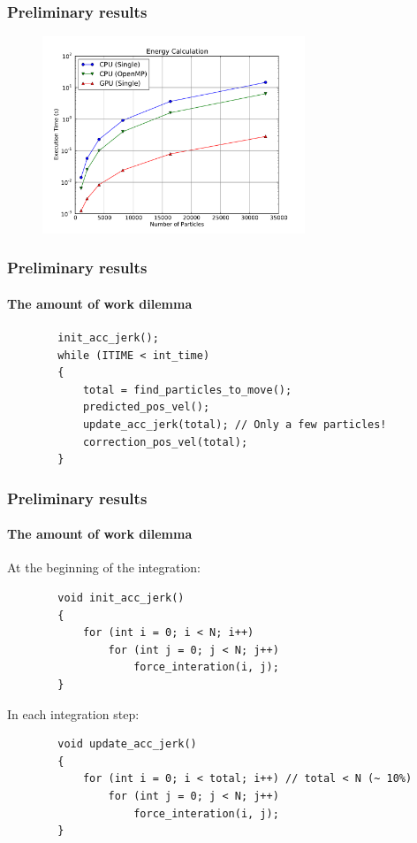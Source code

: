 \begin{frame}
    \frametitle{Preliminary results}
    \begin{figure}
        \centering
        \label{fig:energy}
        \includegraphics[width=0.7\textwidth]{img/energy.pdf}
    \end{figure}
\end{frame}


\begin{frame}[fragile]
    \frametitle{Preliminary results}
    \framesubtitle{The amount of work dilemma}

    \begin{lstlisting}
        init_acc_jerk();
        while (ITIME < int_time)
        {
            total = find_particles_to_move();
            predicted_pos_vel();
            update_acc_jerk(total); // Only a few particles!
            correction_pos_vel(total);
        }
    \end{lstlisting}
\end{frame}

\begin{frame}[fragile]
    \frametitle{Preliminary results}
    \framesubtitle{The amount of work dilemma}

    At the beginning of the integration:

    \begin{lstlisting}
        void init_acc_jerk()
        {
            for (int i = 0; i < N; i++)
                for (int j = 0; j < N; j++)
                    force_interation(i, j);
        }
    \end{lstlisting}

    In each integration step:

    \begin{lstlisting}
        void update_acc_jerk()
        {
            for (int i = 0; i < total; i++) // total < N (~ 10%)
                for (int j = 0; j < N; j++)
                    force_interation(i, j);
        }
    \end{lstlisting}
\end{frame}

